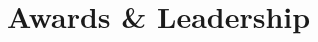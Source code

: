 \documentclass[10pt, letterpaper]{article}
\newenvironment{highlights}{
    \begin{itemize}[
        topsep=0.10 cm,
        parsep=0.10 cm,
        partopsep=0pt,
        itemsep=0pt,
        leftmargin=0 cm + 10pt
    ]
}{
    \end{itemize}
} %
\newenvironment{onecolentry}{
    \begin{adjustwidth}{
        0 cm + 0.00001 cm
    }{
        0 cm + 0.00001 cm
    }
}{
    \end{adjustwidth}
} %
\newenvironment{twocolentry}[2][]{
    \onecolentry
    \def\secondColumn{#2}
    \setcolumnwidth{\fill, 4.5 cm}
    \begin{paracol}{2}
}{
    \switchcolumn \raggedleft \secondColumn
    \end{paracol}
    \endonecolentry
} %
\begin{document}






        
        



    

    \section{Awards \& Leadership}
\end{document}

